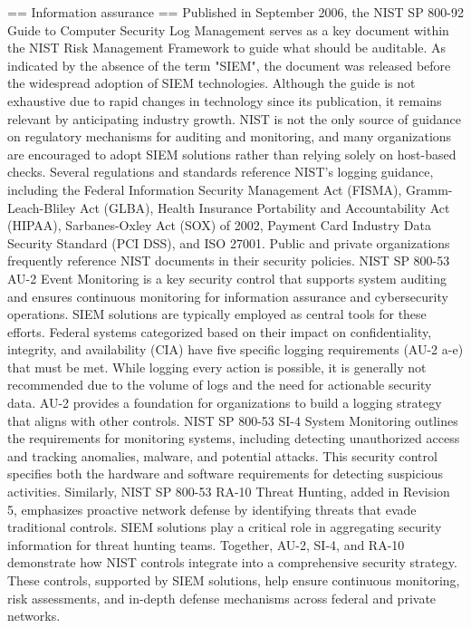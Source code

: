 == Information assurance ==
Published in September 2006, the NIST SP 800-92 Guide to Computer Security Log Management serves as a key document within the NIST Risk Management Framework to guide what should be auditable. As indicated by the absence of the term "SIEM", the document was released before the widespread adoption of SIEM technologies. Although the guide is not exhaustive due to rapid changes in technology since its publication, it remains relevant by anticipating industry growth. NIST is not the only source of guidance on regulatory mechanisms for auditing and monitoring, and many organizations are encouraged to adopt SIEM solutions rather than relying solely on host-based checks.
Several regulations and standards reference NIST’s logging guidance, including the Federal Information Security Management Act (FISMA), Gramm-Leach-Bliley Act (GLBA), Health Insurance Portability and Accountability Act (HIPAA), Sarbanes-Oxley Act (SOX) of 2002, Payment Card Industry Data Security Standard (PCI DSS), and ISO 27001. Public and private organizations frequently reference NIST documents in their security policies.
NIST SP 800-53 AU-2 Event Monitoring is a key security control that supports system auditing and ensures continuous monitoring for information assurance and cybersecurity operations. SIEM solutions are typically employed as central tools for these efforts. Federal systems categorized based on their impact on confidentiality, integrity, and availability (CIA) have five specific logging requirements (AU-2 a-e) that must be met. While logging every action is possible, it is generally not recommended due to the volume of logs and the need for actionable security data. AU-2 provides a foundation for organizations to build a logging strategy that aligns with other controls.
NIST SP 800-53 SI-4 System Monitoring outlines the requirements for monitoring systems, including detecting unauthorized access and tracking anomalies, malware, and potential attacks. This security control specifies both the hardware and software requirements for detecting suspicious activities. Similarly, NIST SP 800-53 RA-10 Threat Hunting, added in Revision 5, emphasizes proactive network defense by identifying threats that evade traditional controls. SIEM solutions play a critical role in aggregating security information for threat hunting teams.
Together, AU-2, SI-4, and RA-10 demonstrate how NIST controls integrate into a comprehensive security strategy. These controls, supported by SIEM solutions, help ensure continuous monitoring, risk assessments, and in-depth defense mechanisms across federal and private networks.



